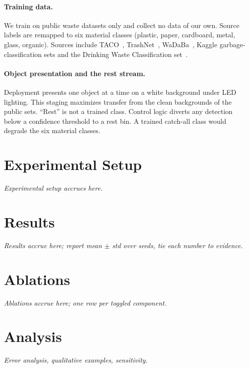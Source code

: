 \documentclass{article}
\begin{document}
\paragraph{Training data.}
We train on public waste datasets only and collect no data of our own.
Source labels are remapped to six material classes (plastic, paper, cardboard, metal, glass, organic).
Sources include TACO~\citep{proenca2020taco}, TrashNet~\citep{yang2016trashnet}, WaDaBa~\citep{bobulski2018wadaba}, Kaggle garbage-classification sets and the Drinking Waste Classification set~\citep{serezhkin2020drinking}.

\paragraph{Object presentation and the rest stream.}
Deployment presents one object at a time on a white background under LED lighting.
This staging maximizes transfer from the clean backgrounds of the public sets.
``Rest'' is not a trained class.
Control logic diverts any detection below a confidence threshold to a rest bin.
A trained catch-all class would degrade the six material classes.

\section{Experimental Setup}
\textit{Experimental setup accrues here.}

\section{Results}
\textit{Results accrue here; report mean $\pm$ std over seeds, tie each number to evidence.}


\section{Ablations}
\textit{Ablations accrue here; one row per toggled component.}

\section{Analysis}
\textit{Error analysis, qualitative examples, sensitivity.}
\end{document}
